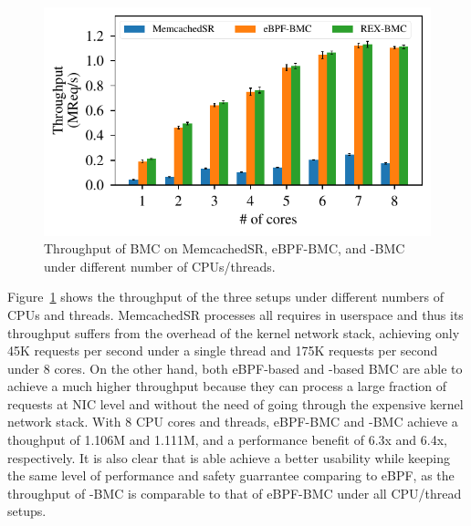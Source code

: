 \begin{figure}
    \includegraphics[width=1.0\linewidth]{figs/bmc.pdf}
    \centering
    \vspace{-25pt}
    \caption{Throughput of BMC on MemcachedSR, eBPF-BMC, and \projname{}-BMC
        under different number of CPUs/threads.
    }
    \label{fig:eval-bmc}
    \vspace{-10pt}
\end{figure}

Figure~\ref{fig:eval-bmc} shows the throughput of the three setups under
    different numbers of CPUs and threads.
MemcachedSR processes all requires in userspace and thus its throughput suffers
    from the overhead of the kernel network stack, achieving only 45K requests
    per second under a single thread and 175K requests per second under 8
    cores.
On the other hand, both eBPF-based and \projname{}-based BMC are able to
    achieve a much higher throughput because they can process a large
    fraction of requests at NIC level and without the need of going through
    the expensive kernel network stack.
With 8 CPU cores and threads, eBPF-BMC and \projname{}-BMC achieve a thoughput
    of 1.106M and 1.111M, and a performance benefit of 6.3x and 6.4x,
    respectively.
It is also clear that \projname{} is able achieve a better usability while
    keeping the same level of performance and safety guarrantee comparing to
    eBPF,  as the throughput of \projname{}-BMC is comparable to that of
    eBPF-BMC under all CPU/thread setups.
